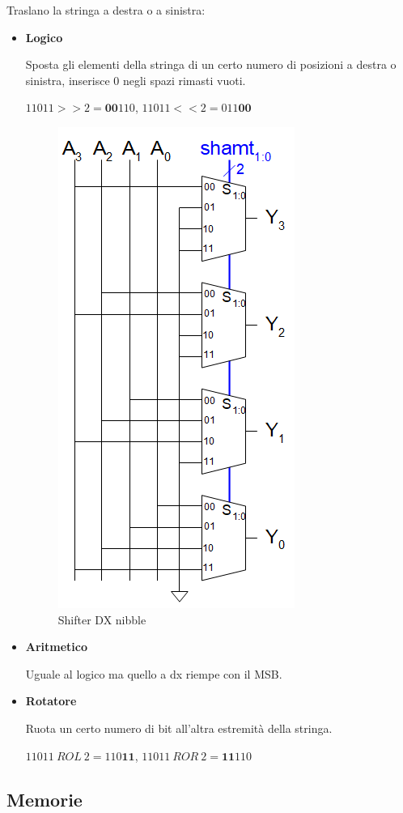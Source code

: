 \documentclass{article}
\begin{document}
Traslano la stringa a destra o a sinistra:
\begin{itemize}
    \item \textbf{Logico}
    
    Sposta gli elementi della stringa di un certo numero di posizioni a destra o sinistra, inserisce 0 negli spazi rimasti vuoti.

    $11011 >> 2 = \textbf{00}110$, $11011<<2=011\textbf{00}$

\begin{figure}[ht]
    \centering
    \includegraphics[width=0.45\linewidth]{shifter.png}
    \caption{Shifter DX nibble}
    \label{fig:shifter}
\end{figure}
        
    \item \textbf{Aritmetico}
    
    Uguale al logico ma quello a dx riempe con il MSB.
    
    \item \textbf{Rotatore}
    
    Ruota un certo numero di bit all'altra estremità della stringa.

    $11011\ ROL\ 2 = 110\textbf{11}$, $11011\ ROR\ 2=\textbf{11}110$
    
\end{itemize}

\newpage

\subsection{Memorie}
\end{document}
